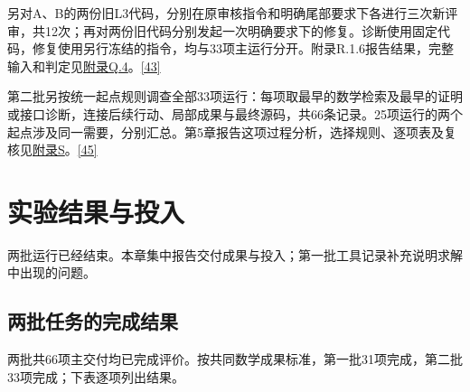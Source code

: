 另对A、B的两份旧L3代码，分别在原审核指令和明确尾部要求下各进行三次新评审，共12次；再对两份旧代码分别发起一次明确要求下的修复。诊断使用固定代码，修复使用另行冻结的指令，均与33项主运行分开。附录R.1.6报告结果，完整输入和判定见\href{zh-appendix.pdf\#q4}{附录Q.4}。\hyperlink{ref-43}{\mbox{[43]}}

第二批另按统一起点规则调查全部33项运行：每项取最早的数学检索及最早的证明或接口诊断，连接后续行动、局部成果与最终源码，共66条记录。25项运行的两个起点涉及同一需要，分别汇总。第5章报告这项过程分析，选择规则、逐项表及复核见\href{zh-appendix.pdf\#appendix-s}{附录S}。\hyperlink{ref-45}{\mbox{[45]}}

\section[实验结果与投入]{\texorpdfstring{\protect\hypertarget{section-3}{}实验结果与投入}{实验结果与投入}}
两批运行已经结束。本章集中报告交付成果与投入；第一批工具记录补充说明求解中出现的问题。

\subsection[两批任务的完成结果]{\texorpdfstring{\protect\hypertarget{section-3-1}{}两批任务的完成结果}{两批任务的完成结果}}
两批共66项主交付均已完成评价。按共同数学成果标准，第一批31项完成，第二批33项完成；下表逐项列出结果。


